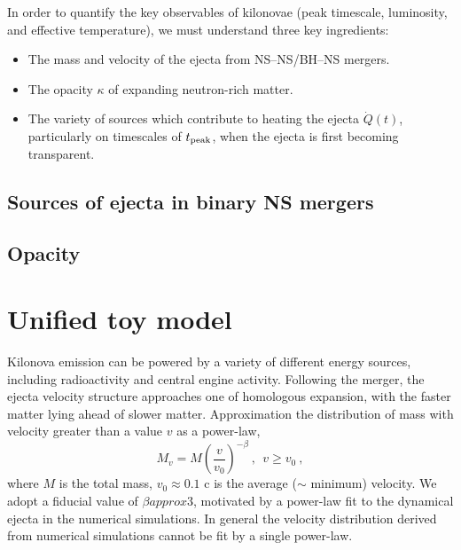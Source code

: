 \documentclass[11pt,a4paper]{article}
\begin{document}
In order to quantify the key observables of kilonovae (peak timescale, luminosity, and effective temperature), we must understand three key ingredients:
\begin{itemize}
   \item The mass and velocity of the ejecta from NS–NS/BH–NS mergers.
   \item The opacity $\kappa$ of expanding neutron-rich matter.
   \item The variety of sources which contribute to heating the ejecta $\dot{Q}(t)$, particularly on timescales of $t_{\rm peak}$, when the ejecta is first becoming transparent.
   \end{itemize}




\subsection{Sources of ejecta in binary NS mergers}









\subsection{Opacity}




\section{Unified toy model}
Kilonova emission can be powered by a variety of different energy sources, including radioactivity and central engine activity. Following the merger, the ejecta velocity structure approaches one of homologous expansion, with the faster matter lying ahead of slower matter. Approximation the distribution of mass with velocity greater than a value $v$ as a power-law,
\begin{equation}
M_v = M\left( \dfrac{v}{v_0} \right)^{-\beta} ~, ~~ v \geqslant v_0 ~,
\end{equation}
where $M$ is the total mass, $v_0 \approx 0.1$ c is the average ($\sim$ minimum) velocity. We adopt a fiducial value of $\beta approx 3$, motivated by a power-law fit to the dynamical ejecta in the numerical simulations. In general the velocity distribution derived from numerical simulations cannot be fit by a single power-law. 
\end{document}
